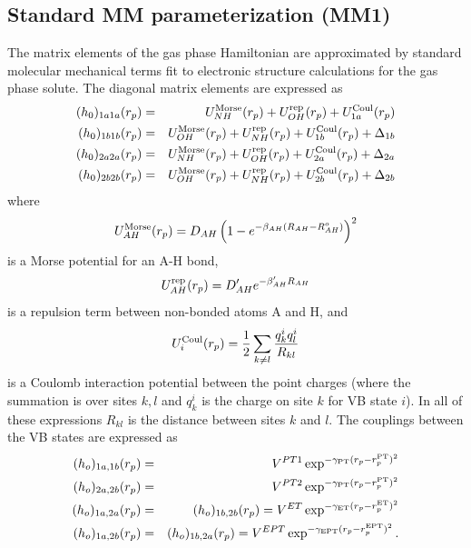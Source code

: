 \documentclass[oneside,11pt,openany]{book}
\newcommand{\tw}{\ttfamily}
\begin{document}
\subsection{Standard MM parameterization ({\tw MM1})}
The matrix elements of the gas phase Hamiltonian are approximated
by standard molecular mechanical terms fit to electronic structure
calculations for the gas phase solute. The diagonal matrix
elements are expressed as
%
\begin{eqnarray}
(h_{0})_{1a1a}(r_p) &=& U^{\rm{Morse}}_{NH}(r_p) + U^{\rm{rep}}_{OH}(r_p) +
U^{\rm{Coul}}_{1a}(r_p) \\ \nonumber
(h_{0})_{1b1b}(r_p) &=& U^{\rm{Morse}}_{OH}(r_p) + U^{\rm{rep}}_{NH}(r_p) +
U^{\rm{Coul}}_{1b}(r_p) + \Delta_{1b}\\ \nonumber
(h_{0})_{2a2a}(r_p) &=& U^{\rm{Morse}}_{NH}(r_p) + U^{\rm{rep}}_{OH}(r_p) +
U^{\rm{Coul}}_{2a}(r_p) + \Delta_{2a}\\ \nonumber
(h_{0})_{2b2b}(r_p) &=& U^{\rm{Morse}}_{OH}(r_p) + U^{\rm{rep}}_{NH}(r_p) +
U^{\rm{Coul}}_{2b}(r_p) + \Delta_{2b}
\label{eq.MM}
\end{eqnarray}
%
where
%
\begin{equation}
U^{\rm{Morse}}_{AH}(r_p) = D_{AH}\left(1-e^{-\beta_{AH}(R_{AH}-R_{AH}^{o})}\right)^2
\label{Morse}
\end{equation}
%
is a Morse potential for an A-H bond,
%
\begin{equation}
U^{\rm{rep}}_{AH}(r_p) = D'_{AH}e^{-\beta'_{AH}R_{AH}}
\label{Rep}
\end{equation}
%
is a repulsion term between non-bonded atoms A and H, and
%
\begin{equation}
U^{\rm{Coul}}_{i}(r_p) = \frac{1}{2}\sum_{k\ne l}\frac{q_k^{i}q_l^{i}}{R_{kl}}
\label{Coul}
\end{equation}
%
is a Coulomb interaction potential between the point charges 
(where the summation is over
sites $k,l$ and $q_k^i$ is the charge on site $k$ for VB state $i$).
In all of these expressions $R_{kl}$ is the distance between sites
$k$ and $l$.
%
The couplings between the VB states are expressed as
%
\begin{eqnarray}
(h_o)_{1a,1b}(r_p) &=&  V^{PT1}\exp^{-\gamma_{\rm PT}(r_p-r_p^{\rm PT})^2}\\ \nonumber
(h_o)_{2a,2b}(r_p) &=&  V^{PT2}\exp^{-\gamma_{\rm PT}(r_p-r_p^{\rm PT})^2}\\ \nonumber
(h_o)_{1a,2a}(r_p) &=& (h_o)_{1b,2b}(r_p)
 = V^{ET}\exp^{-\gamma_{\rm ET}(r_p-r_p^{\rm ET})^2}  \\ \nonumber
(h_o)_{1a,2b}(r_p) &=& (h_o)_{1b,2a}(r_p)
 = V^{EPT}\exp^{-\gamma_{\rm EPT}(r_p-r_p^{\rm EPT})^2}.
\label{eq.offdiagparam}
\end{eqnarray}
%
\end{document}

